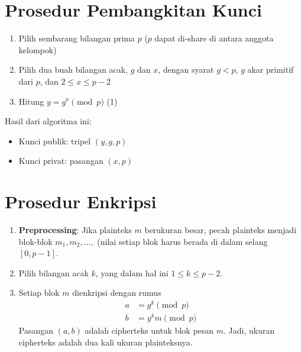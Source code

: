 \documentclass{article}
\begin{document}
\newpage


\section*{Prosedur Pembangkitan Kunci}

\begin{enumerate}
    \item Pilih sembarang bilangan prima $p$ ($p$ dapat di-share di antara anggota kelompok)
    \item Pilih dua buah bilangan acak, $g$ dan $x$, dengan syarat $g < p$, $g$ akar primitif dari $p$, dan $2 \le x \le p - 2$
    \item Hitung $y = g^x \pmod{p}$ \hfill (1)
\end{enumerate}

\noindent Hasil dari algoritma ini:
\begin{itemize}
    \item Kunci publik: tripel $(y, g, p)$
    \item Kunci privat: pasangan $(x, p)$
\end{itemize}

\newpage


\section*{Prosedur Enkripsi}

\begin{enumerate}
    \item \textbf{Preprocessing}: Jika plainteks $m$ berukuran besar, pecah plainteks menjadi blok-blok $m_1, m_2, \dots,$ (nilai setiap blok harus berada di dalam selang $[0, p - 1]$.
    \item Pilih bilangan acak $k$, yang dalam hal ini $1 \le k \le p - 2$.
    \item Setiap blok $m$ dienkripsi dengan rumus
    \begin{align}
        a &= g^k \pmod{p} \tag{2} \\
        b &= y^k m \pmod{p} \tag{3}
    \end{align}
    Pasangan $(a, b)$ adalah cipherteks untuk blok pesan $m$. Jadi, ukuran cipherteks adalah dua kali ukuran plainteksnya.
\end{enumerate}

\newpage
\end{document}
